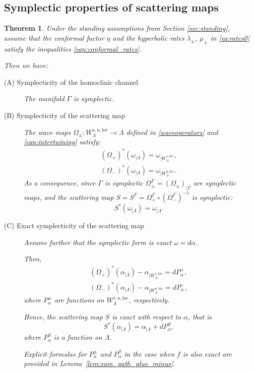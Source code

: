 \documentclass[11pt]{amsart}
\newtheorem{thm}{Theorem}[section]
\theoremstyle{definition}
\theoremstyle{remark}
\numberwithin{equation}{section}
\begin{document}
\subsection{Symplectic properties of scattering maps}
\label{geomScat}


\begin{thm}\label{thm:main2}
Under  the standing assumptions from Section \ref{sec:standing}, assume that the conformal factor $\eta$ and the hyperbolic rates  $\lambda_\pm$, $\mu_\pm$  in \eqref{eq:rates0} satisfy the inequalities \eqref{eqn:conformal_rates}.

Then we have:

\begin{description}
\item[(A) Symplecticity of the homoclinic channel]

The manifold  $\Gamma$ is symplectic.
\item[(B)  Symplecticity of the scattering map]

The wave maps $\Omega_\pm:W^{s,u,\mathrm{loc}}_\Lambda  \to \Lambda$ defined in \eqref{waveoperators}
and \eqref{eqn:intertwining} satisfy:
\begin{equation}
\label{eqn:symplecticwavemaps}
\begin{split}
 (\Omega_+)^* (\omega_{\mid \Lambda}) = \omega_{\mid W^{s,\mathrm{loc}}_{ \Lambda }},\\
 (\Omega_-)^* (\omega_{\mid \Lambda}) = \omega_{\mid W^{u,\mathrm{loc}}_{ \Lambda }} .
\end{split}
\end{equation}
As a consequence, since $\Gamma$ is symplectic $\Omega_\pm^\Gamma =(\Omega_\pm) _{\mid \Gamma} $ are symplectic maps,  and the scattering map  $S=S^\Gamma= \Omega_+^\Gamma \circ (\Omega_-^\Gamma) ^{-1}$
is symplectic:
\[
S^*(\omega_{\mid\Lambda})=\omega_{\mid\Lambda}.
\]
\item[(C)  Exact symplecticity of the scattering map]
Assume further that the symplectic form is exact $\omega = d\alpha$.


Then,
\begin{equation}\label{eqn:wave_exact}
\begin{split}
(\Omega_+)^*(\alpha_{\mid \Lambda})-\alpha_{\mid W^{s,\mathrm{loc}}_\Lambda} =dP^+_\alpha ,\\
(\Omega_-)^*(\alpha_{\mid \Lambda})-\alpha_{\mid W^{u,\mathrm{loc}}_\Lambda} =dP^-_\alpha ,
\end{split}
\end{equation}
where $P^\pm_\alpha$ are  functions on $W^{s,u,\textrm{loc}}_\Lambda$, respectively.

Hence, the scattering map $S$ is exact with respect to $\alpha$, that is
\[
S^*(\alpha_{\mid \Lambda}) =\alpha _{\mid \Lambda}+dP_\alpha^S ,
\]
where $P_\alpha^S$ is  a function on $\Lambda$.

Explicit formulas for $P_\alpha^\pm$ and $P_\alpha^S$ in the case when $f$ is also exact are provided in Lemma~\ref{lem:sum_path_plus_minus}.
\end{description}
\end{thm}
\end{document}

